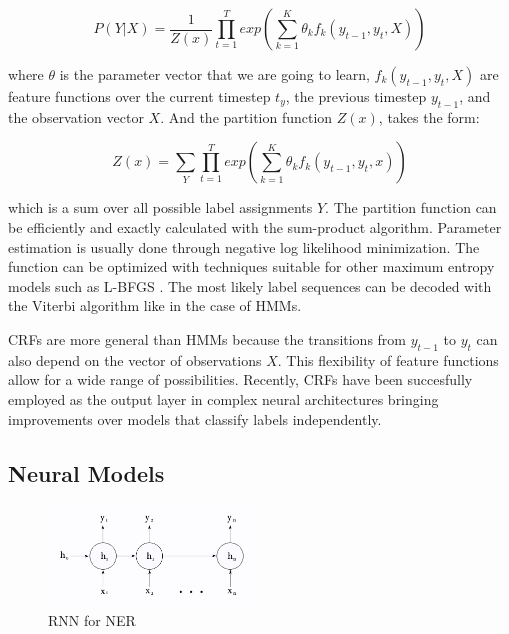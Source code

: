 \documentclass[sigconf]{acmart}
\begin{document}
\begin{equation}
P(Y|X) = \frac{1}{Z(x)} \prod_{t=1}^{T} exp \left( \sum_{k=1}^{K} \theta_k f_k(y_{t-1}, y_t, X) \right)
\end{equation}

where $ \theta $ is the parameter vector that we are going to learn, $ f_k(y_{t-1}, y_{t}, X) $ 
are feature functions over the current timestep $ t_y $, the previous timestep $ y_{t-1}$, 
and the observation vector $ X $. And the partition function $ Z(x) $, takes the form:

\begin{equation}
Z(x) = \sum_{Y} \prod_{t=1}^{T} exp \left( \sum_{k=1}^{K} \theta_k f_k(y_{t-1}, y_t, x) \right)
\end{equation}

which is a sum over all possible label assignments $ Y $. The partition function can be efficiently
and exactly calculated with the sum-product algorithm. Parameter estimation is usually done through 
negative log likelihood minimization. The function can be optimized with techniques suitable for other 
maximum entropy models such as L-BFGS \cite{Liu1989}. The most likely label sequences can be decoded 
with the Viterbi algorithm like in the case of HMMs.

CRFs are more general than HMMs because the transitions from $ y_{t-1} $ to $ y_{t} $ can also depend 
on the vector of observations $ X $. This flexibility of feature functions allow for a wide range of
possibilities. Recently, CRFs have been succesfully employed as the output layer in complex neural 
architectures bringing improvements over models that classify labels independently.

\subsection{Neural Models}

\begin{figure}
  \centering
  \includegraphics[width=0.5\textwidth]{pics/rnn_network}
  \caption{RNN for NER}
  \label{fig:rnn_network}
\end{figure}
\end{document}

